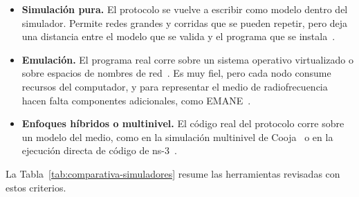\begin{itemize}
\item \textbf{Simulación pura.} El protocolo se vuelve a escribir como modelo
dentro del simulador. Permite redes grandes y corridas que se pueden repetir, pero
deja una distancia entre el modelo que se valida y el programa que se
instala~\cite{Kiess2007RealWorld}.

\item \textbf{Emulación.} El programa real corre sobre un sistema operativo
virtualizado o sobre espacios de nombres de red~\cite{Ahrenholz2008Core,Lantz2010Mininet}.
Es muy fiel, pero cada nodo consume recursos del computador, y para representar el
medio de radiofrecuencia hacen falta componentes adicionales, como
EMANE~\cite{Emane}.

\item \textbf{Enfoques híbridos o multinivel.} El código real del protocolo corre
sobre un modelo del medio, como en la simulación multinivel de
Cooja~\cite{Osterlind2006Cooja} o en la ejecución directa de código de
ns-3~\cite{Tazaki2013DCE}.
\end{itemize}

La Tabla~\ref{tab:comparativa-simuladores} resume las herramientas revisadas con
estos criterios.

